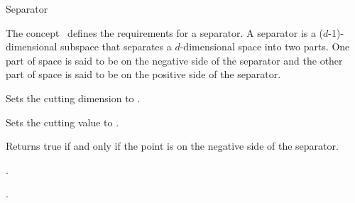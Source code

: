 

\begin{ccRefConcept}{Separator}



\ccDefinition
  
The concept \ccRefName\ defines the requirements for a separator.
A separator is a ($d$-1)-dimensional subspace that separates a $d$-dimensional space into two parts.
One part of space is said to be on the negative side of the separator and the other part of space is 
said to be on the positive side of the separator.

\ccTypes


\ccCreation
{}  %


\ccOperations

{Sets the cutting dimension to . }

{Sets the cutting value to . }





{Returns true if and only if the point  is on the negative side of the separator.}


\ccHasModels

.

\ccSeeAlso

.


\end{ccRefConcept}


